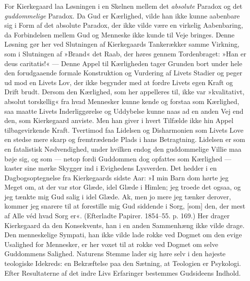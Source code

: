 \documentclass[12pt,a4paper,openany]{book}
\newcommand{\opage}[1]{\marginnote{\footnotesize\textit{[#1]}}}
\begin{document}
For Kierkegaard laa Løsningen i en Skelnen mellem
det \textit{absolute} Paradox og det \textit{guddommelige} Paradox. Da
Gud er Kærlighed, vilde han ikke kunne aabenbare sig
i Form af det absolute Paradox, der ikke vilde være en
virkelig Aabenbaring, da Forbindelsen mellem Gud og
Menneske ikke kunde til Veje bringes. Denne Løsning
gør her ved Slutningen af Kierkegaards Tankerækker
samme Virkning, som i Slutningen af »Brand« det Raab,
der høres gennem Tordenbraget: »Han er deus caritatis!«
--- Denne Appel til Kærligheden tager Grunden bort
under hele den forudgaaende formale Konstruktion og
Vurdering af Livets Stadier og peger ud mod en Livets
Lov, der ikke begynder med at fordre Livets egen Kraft
og Drift brudt. Dersom den Kærlighed, som her appelleres
til, ikke var »kvalitativt, absolut torskellig« fra
hvad Mennesker kunne kende og forstaa som Kærlighed,
saa maatte Livets Inderliggørelse og Uddybelse kunne
naas ad en anden Vej end den, som Kierkegaard anviste.
Men han giver i hvert Tilfælde ikke hin Appel tilbagevirkende
Kraft. Tvertimod faa Lidelsen og Disharmonien
som Livets Love en stedse mere skarp og fremtrædende
Plads i hans Betragtning. Lidelsen er som en fatalistisk
Nødvendighed, under hvilken endog den guddommelige
Villie maa bøje sig, og som --- netop fordi Guddommen
dog opfattes som Kærlighed --- kaster sine mørke Skygger
ind i Evighedens Lysverden. Det hedder i en Dagbogsoptegnelse
fra Kierkegaards sidste Aar: »I min Barn%
\opage{126}dom hørte jeg Meget om, at der var stor Glæde, idel
Glæde i Himlen; jeg troede det ogsaa, og jeg tænkte mig
Gud salig i idel Glæde. Ak, men jo mere jeg tænker
derover, kommer jeg snarere til at forestille mig Gud
siddende i Sorg, [som] den, der mest af Alle véd hvad
Sorg er«. (Efterladte Papirer. 1854--55. p. 169.) Her
drager Kierkegaard da den Konsekvents, han i en anden
Sammenhæng ikke vilde drage. Den menneskelige Sympati,
han ikke vilde lade rokke ved Dogmet om den
evige Usalighed for Mennesker, er her voxet til at rokke
ved Dogmet om selve Guddommens Salighed. Naturens
Stemme lader sig høre selv i den højeste teologiske Idekreds:
en Bekræftelse paa den Sætning, at Teologien er
Psykologi. Efter Resultaterne af det indre Livs Erfaringer
bestemmes Gudsideens Indhold.
\end{document}

